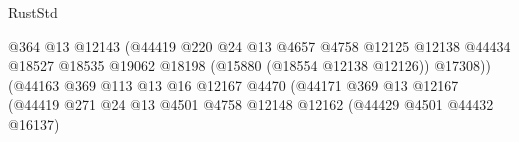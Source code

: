 \begin{lexlean}{RustStd}
\begin{coremodule}
                                                            @364
                                                            @13
                                                            @12143
                                                            (@44419
                                                              @220
                                                              @24
                                                              @13
                                                              @4657
                                                              @4758
                                                              @12125
                                                              @12138
                                                              @44434
                                                              @18527
                                                              @18535
                                                              @19062
                                                              @18198
                                                              (@15880 (@18554 @12138 @12126))
                                                              @17308))
                                                          (@44163
                                                            @369
                                                            @113
                                                            @13
                                                            @16
                                                            @12167
                                                            @4470
                                                            (@44171
                                                              @369
                                                              @13
                                                              @12167
                                                              (@44419
                                                                @271
                                                                @24
                                                                @13
                                                                @4501
                                                                @4758
                                                                @12148
                                                                @12162
                                                                (@44429 @4501 @44432 @16137)

\end{coremodule}
\end{lexlean}
